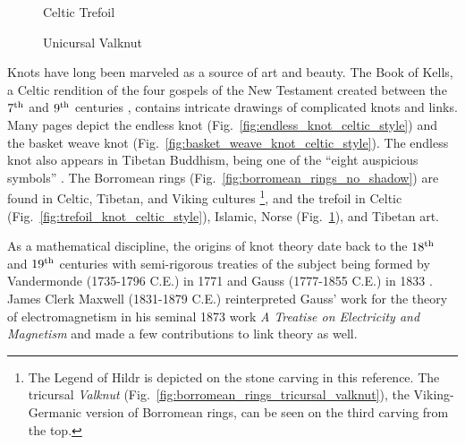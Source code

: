 \begin{figure}
    \centering
    \begin{minipage}[b]{0.49\textwidth}
        \centering
        \caption{Celtic Trefoil}
        \label{fig:trefoil_knot_celtic_style}
    \end{minipage}
    \begin{minipage}[b]{0.49\textwidth}
        \centering
        \caption{Unicursal Valknut}
        \label{fig:trefoil_unicursal_valknut}
    \end{minipage}
\end{figure}
Knots have long been marveled as a source of art and beauty. The Book of
Kells, a Celtic rendition of the four gospels of the New Testament created
between the $7^{\small\textrm{th}}$ and $9^{\small\textrm{th}}$
centuries \cite[p.~108]{Nordenfalk1977}, contains intricate drawings of
complicated knots and links. Many pages depict the endless knot
(Fig.~\ref{fig:endless_knot_celtic_style}) and the basket weave knot
(Fig.~\ref{fig:basket_weave_knot_celtic_style}). The endless knot also appears
in Tibetan Buddhism, being one of the ``eight auspicious symbols''
\cite[p.~11]{BeerTibetanSymbols}. The Borromean rings
(Fig.~\ref{fig:borromean_rings_no_shadow}) are found in Celtic, Tibetan,
and Viking cultures
\cite[p.~129]{VikingWomenJesch}%
\footnote{%
    The Legend of Hildr is depicted on the stone carving in this
    reference. The tricursal \textit{Valknut}
    (Fig.~\ref{fig:borromean_rings_tricursal_valknut}),
    the Viking-Germanic version of Borromean rings,
    can be seen on the third carving from the top.
},
and the trefoil in Celtic (Fig.~\ref{fig:trefoil_knot_celtic_style}),
Islamic, Norse (Fig.~\ref{fig:trefoil_unicursal_valknut}), and Tibetan art.
\par\hfill\par
As a mathematical discipline, the origins of knot theory
date back to the $18^{\small\textrm{th}}$ and
$19^{\small\textrm{th}}$ centuries with semi-rigorous treaties of
the subject being formed by Vandermonde (1735-1796 C.E.) in 1771
\cite{Vanermonde1771} and Gauss
(1777-1855 C.E.) in 1833 \cite[p.~1327]{RiccaNipotaGaussLinkingNumber}.
James Clerk Maxwell (1831-1879 C.E.) reinterpreted Gauss' work for the theory
of electromagnetism in his seminal 1873 work
\textit{A Treatise on Electricity and Magnetism}
\cite{MaxwellTreatist1873} and made a few contributions to link theory as well.

